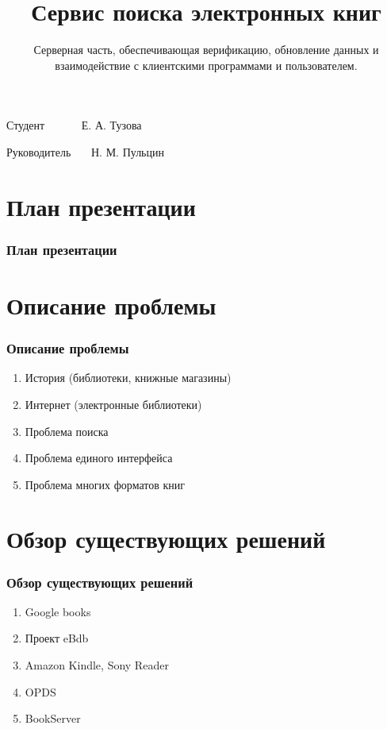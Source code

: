 \documentclass[handout]{beamer}
\title{Сервис поиска электронных книг }
\subtitle{Серверная часть, обеспечивающая верификацию, обновление данных и взаимодействие с клиентскими программами и пользователем.}
\date{}
\begin{document}
\begin{frame}
  \titlepage
  \begin{flushright}
    Студент~~~~~~  Е. А. Тузова
  
    Руководитель~~~  Н. М. Пульцин

  \end{flushright}
\end{frame}

\section*{План презентации}
  \begin{frame}
    \frametitle{План презентации}
    \tableofcontents[pausesections]

  \end{frame}

\section{Описание проблемы}
  \begin{frame}

    \frametitle{Описание проблемы}
    \begin{enumerate}
      \item История (библиотеки, книжные магазины)
      \item Интернет (электронные библиотеки)
      \item Проблема поиска
      \item Проблема единого интерфейса
      \item Проблема многих форматов книг
      \end{enumerate}
  \end{frame}

\section{Обзор существующих решений}
  \begin{frame}
    \frametitle{Обзор существующих решений}

    \begin{enumerate}
      \item Google books
      \item Проект eBdb
      \item Amazon Kindle, Sony Reader
      \item OPDS
      \item BookServer
    \end{enumerate}
  \end{frame}
\end{document}

